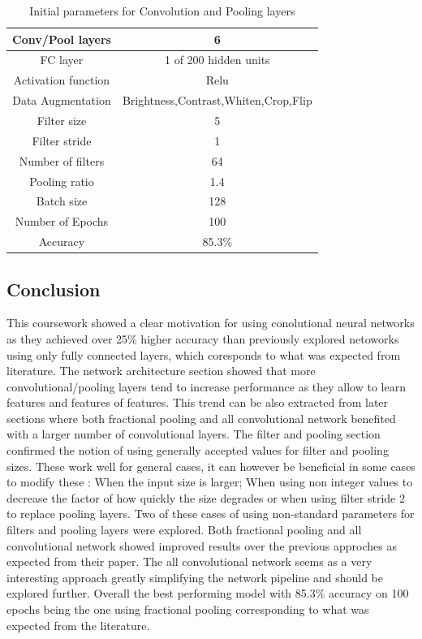 \documentclass[12pt]{article}
\begin{document}
\begin{table}[H]
\centering
\begin{tabular}[h]{| c | c |}
\hline
Conv/Pool layers & 6  \\
\hline
FC layer & 1 of 200 hidden units  \\
\hline
Activation function & Relu  \\
\hline
Data Augmentation & Brightness,Contrast,Whiten,Crop,Flip \\
\hline 
Filter size & 5  \\
\hline
Filter stride & 1   \\
\hline
Number of filters & 64   \\
\hline
Pooling ratio & 1.4  \\
\hline 
Batch size & 128   \\
\hline 
Number of Epochs & 100   \\
\hline 
Accuracy &    85.3\% \\
\hline 
\end{tabular} 
\caption{Initial parameters for Convolution and Pooling layers}
\label{tab:fracres}
\end{table}

\subsection*{Conclusion}
This coursework showed a clear motivation for using conolutional neural networks as they achieved over 25\% higher accuracy than previously explored netoworks using only fully connected layers, which coresponds to what was expected from literature\cite{inspiration}\cite{alexnet}\cite{stan}.
The network architecture section showed that more convolutional/pooling layers tend to increase performance as they allow to learn features and features of features. This trend can be also extracted from later sections where both fractional pooling and all convolutional network benefited with a larger number of convolutional layers.
 The filter and pooling section confirmed the notion of using generally accepted values for filter and pooling sizes\cite{kernel}\cite{inspiration}\cite{bestprac}. These work well for general cases, it can however be beneficial in some cases to modify these : When the input size is larger\cite{alexnet}; When using non integer values to decrease the factor of how quickly the size degrades\cite{frac} or when using filter stride 2 to replace pooling layers\cite{allconv}.
Two of these cases of using non-standard parameters for filters and pooling layers were explored. Both fractional pooling and all convolutional network showed improved results over the previous approches as expected from their paper\cite{frac}\cite{allconv}. The all convolutional network seems as a very interesting approach greatly simplifying the network pipeline and should be explored further. Overall the best performing model with 85.3\% accuracy on 100 epochs being the one using fractional pooling corresponding to what was expected from the literature\cite{frac}. 
\end{document}
